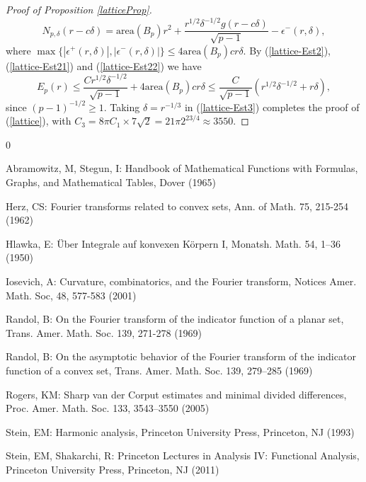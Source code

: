 \documentclass{amsart}
\numberwithin{equation}{section}
\begin{document}
\begin{proof}[Proof of Proposition \ref{latticeProp}]
\begin{equation}
    \label{lattice-Est22}
    N_{p,\delta}(r-c\delta)=\text{area}(B_p) r^2+\frac{r^{1/2}\delta^{-1/2}g(r-c\delta)}{\sqrt{p-1}}-\epsilon^-(r,\delta),
\end{equation}
where $\max\{|\epsilon^+(r,\delta)|,|\epsilon^-(r,\delta)|\}\le 4\text{area}(B_p)cr\delta$.
By (\ref{lattice-Est2}), (\ref{lattice-Est21}) and (\ref{lattice-Est22})
we have
\begin{equation}
    \label{lattice-Est3}
     E_p(r)\le\frac{C r^{1/2}\delta^{-1/2}}{\sqrt{p-1}}+4\text{area}(B_p)cr\delta\le\frac{C}{\sqrt{p-1}}(r^{1/2}\delta^{-1/2}+r\delta),
\end{equation}
since $(p-1)^{-1/2}\ge1$.
Taking $\delta=r^{-1/3}$ in (\ref{lattice-Est3}) completes the proof of (\ref{lattice}), with $C_3=8\pi C_1\times 7\sqrt{2}=21\pi 2^{23/4}\approx 3550$.
\end{proof}
\begin{thebibliography}{0}

 Abramowitz, M, Stegun, I: Handbook of Mathematical Functions with Formulas, Graphs, and Mathematical Tables, Dover (1965)



 Herz, CS: Fourier transforms related to convex sets, Ann. of Math. 75, 215-254 (1962)

 Hlawka, E: \"{U}ber Integrale auf konvexen K\"{o}rpern I, Monatsh. Math. 54, 1–36 (1950)

 Iosevich, A: Curvature, combinatorics, and the Fourier transform,  Notices Amer. Math. Soc, 48, 577-583 (2001)


 Randol, B: On the Fourier transform of the indicator function of a planar set, Trans. Amer. Math. Soc. 139, 271-278 (1969)

 Randol, B: On the asymptotic behavior of the Fourier transform of the indicator function of a convex set,  Trans. Amer. Math. Soc. 139, 279–285 (1969)

 Rogers, KM: Sharp van der Corput estimates and minimal divided differences, Proc. Amer. Math. Soc. 133, 3543–3550 (2005)

 Stein, EM: Harmonic analysis, Princeton University Press, Princeton, NJ (1993)

 Stein, EM, Shakarchi, R: Princeton Lectures in Analysis IV: Functional Analysis, Princeton University Press, Princeton, NJ (2011)
\end{thebibliography}
\end{document}

